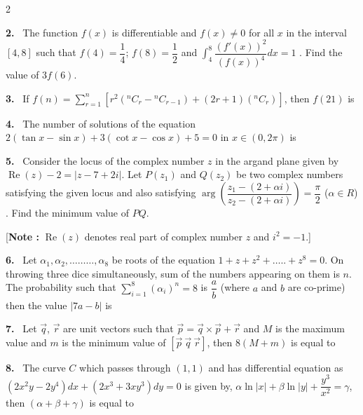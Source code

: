 \documentclass[10pt]{extarticle}
\newcommand{\qn}[1]{\par\smallskip\noindent\textbf{#1.}~}
\begin{document}
\begin{multicols}{2}
\qn{2} The function $f(x)$ is differentiable and $f(x)\ne0$ for all $x$ in the interval $[4,8]$ such that $f(4)=\dfrac14$; $f(8)=\dfrac12$ and $\displaystyle\int_4^8\dfrac{(f'(x))^2}{(f(x))^4}dx=1$ . Find the value of $3f(6)$.

\qn{3} If $f(n)=\displaystyle\sum_{r=1}^{n}\left[r^2\left({}^nC_r-{}^nC_{r-1}\right)+(2r+1)\left({}^nC_r\right)\right]$, then $f(21)$ is

\qn{4} The number of solutions of the equation $2(\tan x-\sin x)+3(\cot x-\cos x)+5=0$ in $x\in(0,2\pi)$ is

\qn{5} Consider the locus of the complex number $z$ in the argand plane given by $\operatorname{Re}(z)-2=|z-7+2i|$. Let $P(z_1)$ and $Q(z_2)$ be two complex numbers satisfying the given locus and also satisfying $\arg\left(\dfrac{z_1-(2+\alpha i)}{z_2-(2+\alpha i)}\right)=\dfrac{\pi}{2}$ ($\alpha\in R$) . Find the minimum value of $PQ$.

[\textbf{Note :} $\operatorname{Re}(z)$ denotes real part of complex number $z$ and $i^2=-1$.]

\qn{6} Let $\alpha_1,\alpha_2,\ldots\ldots\ldots,\alpha_8$ be roots of the equation $1+z+z^2+\ldots..+z^8=0$. On throwing three dice simultaneously, sum of the numbers appearing on them is $n$. The probability such that $\displaystyle\sum_{i=1}^{8}(\alpha_i)^n=8$ is $\dfrac{a}{b}$ (where $a$ and $b$ are co-prime) then the value $|7a-b|$ is

\qn{7} Let $\vec q$, $\vec r$ are unit vectors such that $\vec p=\vec q\times\vec p+\vec r$ and $M$ is the maximum value and $m$ is the minimum value of $[\vec p\ \vec q\ \vec r]$, then $8(M+m)$ is equal to

\qn{8} The curve $C$ which passes through $(1,1)$ and has differential equation as $(2x^2y-2y^4)dx+(2x^3+3xy^3)dy=0$ is given by, $\alpha\ln|x|+\beta\ln|y|+\dfrac{y^3}{x^2}=\gamma$, then $(\alpha+\beta+\gamma)$ is equal to


\end{multicols}
\end{document}
